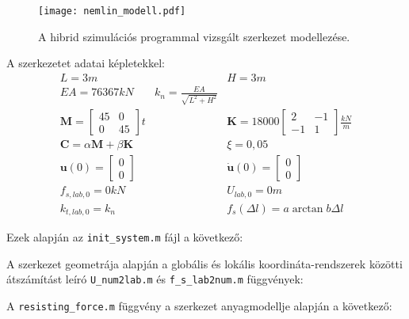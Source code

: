 \begin{figure}[h!]
\centering
\texttt{[image: nemlin\_modell.pdf]}
\caption{A hibrid szimulációs programmal vizsgált szerkezet modellezése.}
\label{fig:viselkedési modell}
\end{figure}

A szerkezetet adatai képletekkel:
\begin{align*}
  & L = 3 m  & & H = 3 m   & \\
  & EA = 76367 kN & k_n = \frac{EA}{\sqrt{L^2+H^2}} & \\
  & \mathbf{M}  = \left[\begin{array}{rr}  45 & 0 \\ 0 & 45 \end{array} \right]t   &  & \mathbf{K} = 18000\left[\begin{array}{rr} 2 & -1 \\ -1 & 1 \end{array} \right]\frac{kN}{m}  &  \\
  & \mathbf{C}  = \alpha\mathbf{M}+\beta\mathbf{K}  &  & \xi = 0,05  & \\
  & \mathbf{u}(0)  = \left[\begin{array}{c} 0 \\ 0 \end{array} \right]  & & \mathbf{\dot{u}}(0) = \left[\begin{array}{c} 0 \\ 0 \end{array} \right] & \\
  & f_{s,lab,0} = 0 kN & &U_{lab,0} = 0 m   & \\
  & k_{t,lab,0} = k_n  & & f_s(\Delta{l})  = a \arctan{b\Delta{l}}&
  \end{align*}

Ezek alapján  az \verb|init_system.m| fájl a következő:

 
 
 
 A szerkezet geometrája alapján a globális és lokális koordináta-rendszerek közötti átszámítást leíró \verb|U_num2lab.m| és \verb|f_s_lab2num.m| függvények:
 
 
 


 A  \verb|resisting_force.m| függvény a szerkezet anyagmodellje alapján a következő:
 
  
 
